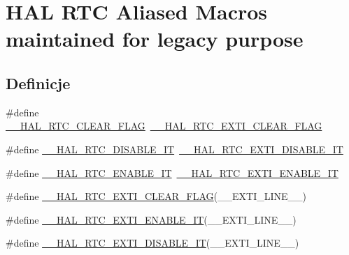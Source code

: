 \hypertarget{group___h_a_l___r_t_c___aliased___macros}{}\section{H\+AL R\+TC Aliased Macros maintained for legacy purpose}
\label{group___h_a_l___r_t_c___aliased___macros}
\subsection*{Definicje}
\begin{DoxyCompactItemize}
\item 
\#define \hyperlink{group___h_a_l___r_t_c___aliased___macros_gaf8b41c0f2f096d2e71f304c00d183e4d}{\+\_\+\+\_\+\+H\+A\+L\+\_\+\+R\+T\+C\+\_\+\+C\+L\+E\+A\+R\+\_\+\+F\+L\+AG}~\hyperlink{group___h_a_l___r_t_c___aliased___macros_ga70c16094f7c10e5991b608df36ce41f8}{\+\_\+\+\_\+\+H\+A\+L\+\_\+\+R\+T\+C\+\_\+\+E\+X\+T\+I\+\_\+\+C\+L\+E\+A\+R\+\_\+\+F\+L\+AG}
\item 
\#define \hyperlink{group___h_a_l___r_t_c___aliased___macros_gae758f64dcd336b7e63308d205cd92697}{\+\_\+\+\_\+\+H\+A\+L\+\_\+\+R\+T\+C\+\_\+\+D\+I\+S\+A\+B\+L\+E\+\_\+\+IT}~\hyperlink{group___h_a_l___r_t_c___aliased___macros_ga9b18753e4b04bf550e36d81a6064ba36}{\+\_\+\+\_\+\+H\+A\+L\+\_\+\+R\+T\+C\+\_\+\+E\+X\+T\+I\+\_\+\+D\+I\+S\+A\+B\+L\+E\+\_\+\+IT}
\item 
\#define \hyperlink{group___h_a_l___r_t_c___aliased___macros_ga530c1a5aba6a657bf37fbfb6fb6c4ebc}{\+\_\+\+\_\+\+H\+A\+L\+\_\+\+R\+T\+C\+\_\+\+E\+N\+A\+B\+L\+E\+\_\+\+IT}~\hyperlink{group___h_a_l___r_t_c___aliased___macros_ga16764e0df245c740813dbeb302e67da5}{\+\_\+\+\_\+\+H\+A\+L\+\_\+\+R\+T\+C\+\_\+\+E\+X\+T\+I\+\_\+\+E\+N\+A\+B\+L\+E\+\_\+\+IT}
\item 
\#define \hyperlink{group___h_a_l___r_t_c___aliased___macros_ga70c16094f7c10e5991b608df36ce41f8}{\+\_\+\+\_\+\+H\+A\+L\+\_\+\+R\+T\+C\+\_\+\+E\+X\+T\+I\+\_\+\+C\+L\+E\+A\+R\+\_\+\+F\+L\+AG}(\+\_\+\+\_\+\+E\+X\+T\+I\+\_\+\+L\+I\+N\+E\+\_\+\+\_\+)
\item 
\#define \hyperlink{group___h_a_l___r_t_c___aliased___macros_ga16764e0df245c740813dbeb302e67da5}{\+\_\+\+\_\+\+H\+A\+L\+\_\+\+R\+T\+C\+\_\+\+E\+X\+T\+I\+\_\+\+E\+N\+A\+B\+L\+E\+\_\+\+IT}(\+\_\+\+\_\+\+E\+X\+T\+I\+\_\+\+L\+I\+N\+E\+\_\+\+\_\+)
\item 
\#define \hyperlink{group___h_a_l___r_t_c___aliased___macros_ga9b18753e4b04bf550e36d81a6064ba36}{\+\_\+\+\_\+\+H\+A\+L\+\_\+\+R\+T\+C\+\_\+\+E\+X\+T\+I\+\_\+\+D\+I\+S\+A\+B\+L\+E\+\_\+\+IT}(\+\_\+\+\_\+\+E\+X\+T\+I\+\_\+\+L\+I\+N\+E\+\_\+\+\_\+)

\end{DoxyCompactItemize}
